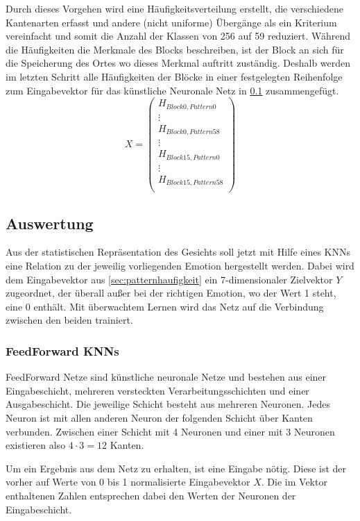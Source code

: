 \documentclass[12pt, a4paper]{article}
\begin{document}
\newpage

Durch dieses Vorgehen wird eine Häufigkeitsverteilung erstellt, die verschiedene Kantenarten erfasst und andere (nicht uniforme) Übergänge als ein Kriterium vereinfacht und somit die Anzahl der Klassen von 256 auf 59 reduziert. Während die Häufigkeiten die Merkmale des Blocks beschreiben, ist der Block an sich für die Speicherung des Ortes wo dieses Merkmal auftritt zuständig. Deshalb werden im letzten Schritt alle Häufigkeiten der Blöcke in einer festgelegten Reihenfolge zum Eingabevektor für das künstliche Neuronale Netz in \ref{sec:auswertung} zusammengefügt.
\[X =
\begin{pmatrix}
	H_{Block 0, Pattern 0} \\
	\vdots \\
	H_{Block 0, Pattern 58} \\
	\vdots \\
	H_{Block 15, Pattern 0} \\
	\vdots \\
	H_{Block 15, Pattern 58} \\
\end{pmatrix} \]


\subsection{Auswertung}
\label{sec:auswertung}
Aus der statistischen Repräsentation des Gesichts soll jetzt mit Hilfe eines KNNs eine Relation zu der jeweilig vorliegenden Emotion hergestellt werden. Dabei wird dem Eingabevektor aus \ref{sec:patternhaufigkeit} ein 7-dimensionaler Zielvektor \(Y\) zugeordnet, der überall außer bei der richtigen Emotion, wo der Wert 1 steht, eine 0 enthält. Mit überwachtem Lernen wird das Netz auf die Verbindung zwischen den beiden trainiert.

\subsubsection{FeedForward KNNs}
FeedForward Netze sind künstliche neuronale Netze und bestehen aus einer Eingabeschicht, mehreren versteckten Verarbeitungsschichten und einer Ausgabeschicht. Die jeweilige Schicht besteht aus mehreren Neuronen. Jedes Neuron ist mit allen anderen Neuron der folgenden Schicht über Kanten verbunden. Zwischen einer Schicht mit 4 Neuronen und einer mit 3 Neuronen existieren also \(4 \cdot 3 = 12\) Kanten.

Um ein Ergebnis aus dem Netz zu erhalten, ist eine Eingabe nötig. Diese ist der vorher auf Werte von 0  bis 1 normalisierte Eingabevektor \(X\). Die im Vektor enthaltenen Zahlen entsprechen dabei den Werten der Neuronen der Eingabeschicht.
\end{document}
